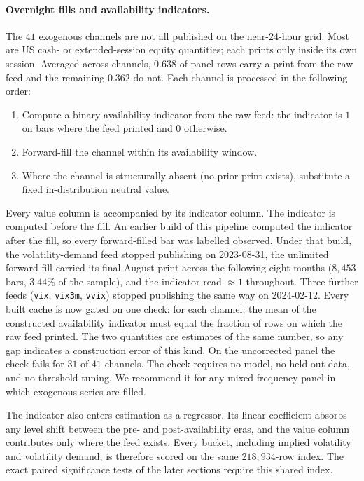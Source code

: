\paragraph{Overnight fills and availability indicators.}
The $41$ exogenous channels are not all published on the near-24-hour
grid. Most are US cash- or extended-session equity quantities; each prints
only inside its own session. Averaged across channels, $0.638$ of panel
rows carry a print from the raw feed and the remaining $0.362$ do not.
Each channel is processed in the following order:
\begin{enumerate}
    \item Compute a binary availability indicator from the raw feed: the
      indicator is $1$ on bars where the feed printed and $0$ otherwise.
    \item Forward-fill the channel within its availability window.
    \item Where the channel is structurally absent (no prior print
      exists), substitute a fixed in-distribution neutral value.
\end{enumerate}
Every value column is accompanied by its indicator column. The indicator
is computed before the fill. An earlier build of this pipeline computed
the indicator after the fill, so every forward-filled bar was labelled
observed. Under that build, the volatility-demand feed stopped publishing
on 2023-08-31, the unlimited forward fill carried its final August print
across the following eight months ($8{,}453$ bars, $3.44\%$ of the
sample), and the indicator read $\approx 1$ throughout. Three further
feeds (\texttt{vix}, \texttt{vix3m}, \texttt{vvix}) stopped publishing the
same way on 2024-02-12. Every built cache is now gated on one check: for
each channel, the mean of the constructed availability indicator must
equal the fraction of rows on which the raw feed printed. The two
quantities are estimates of the same number, so any gap indicates a
construction error of this kind. On the uncorrected panel the check fails
for $31$ of $41$ channels. The check requires no model, no held-out data,
and no threshold tuning. We recommend it for any mixed-frequency panel in
which exogenous series are filled.

The indicator also enters estimation as a regressor. Its linear
coefficient absorbs any level shift between the pre- and post-availability
eras, and the value column contributes only where the feed exists. Every
bucket, including implied volatility and volatility demand, is therefore
scored on the same $218{,}934$-row index. The exact paired significance
tests of the later sections require this shared index.

